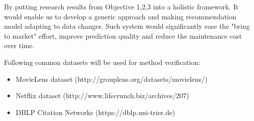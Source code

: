 By putting research results from Objective 1,2,3 into a holistic framework. It would enable us to develop a generic approach and making recommendation model adapting to data changes. Such system would significantly ease the "bring to market" effort, improve prediction quality and reduce the maintenance cost over time. 

Following common datasets will be used for method verification: 

\begin{itemize}

\item MovieLens dataset (http://grouplens.org/datasets/movielens/) 

\item Netflix dataset (http://www.lifecrunch.biz/archives/207) 

\item DBLP Citation Networks (https://dblp.uni-trier.de)  

\end{itemize}